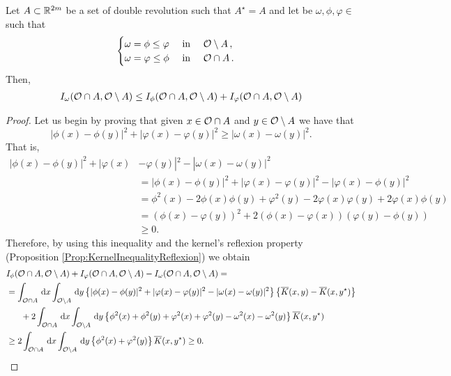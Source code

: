 \begin{lemma}
\label{Lemma: InteractionInequalityMinimumFunction}
Let $A\subset\mathbb{R}^{2m}$ be a set of double revolution such that $A^\star = A$ and let be $\omega, \phi, \varphi \in $ such that
$$\begin{cases}
\omega = \phi \leq \varphi \ \ \ \ \textrm{in } \ \ \ \mathcal{O} \setminus A\,,\\
\omega = \varphi \leq \phi \ \ \ \ \textrm{in } \ \ \ \mathcal{O} \cap A\,.
\end{cases}$$
Then,
\begin{align*}
I_\omega(\mathcal{O}\cap A, \mathcal{O} \setminus A) \leq I_\phi(\mathcal{O}\cap A, \mathcal{O} \setminus A) + I_\varphi(\mathcal{O}\cap A, \mathcal{O} \setminus A)
\end{align*}
\end{lemma}

\begin{proof}
Let us begin by proving that given $x\in \mathcal{O} \cap A$ and $y\in \mathcal{O} \setminus A$ we have that
$$ |\phi(x)-\phi(y)|^2+|\varphi(x)-\varphi(y)|^2\geq |\omega(x)-\omega(y)|^2. $$
That is,
\begin{align*}
|\phi(x)-\phi(y)|^2+|\varphi(x)&-\varphi(y)|^2 - |\omega(x)-\omega(y)|^2 \\
&= |\phi(x)-\phi(y)|^2+|\varphi(x)-\varphi(y)|^2 - |\varphi(x)-\phi(y)|^2 \\
&= \phi^2(x)-2\phi(x)\phi(y)+\varphi^2(y)-2\varphi(x)\varphi(y)+2\varphi(x)\phi(y) \\
&= \left( \phi(x) - \varphi(y)\right) ^2+2\left( \phi(x)-\varphi(x) \right) \left( \varphi(y)-\phi(y) \right) \\
&\geq 0.
\end{align*}
Therefore, by using this inequality and the kernel's reflexion property (Proposition \ref{Prop:KernelInequalityReflexion}) we obtain
\begin{align*}
I_\phi(\ocal\cap A, \ocal \setminus A) &+ I_\varphi(\ocal\cap A, \ocal \setminus A) - I_\omega(\ocal\cap A, \ocal \setminus A) = \\
&\hspace{-26mm}= \int_{\ocal\cap A} \d x \int_{\ocal\setminus A} \d y \left\{|\phi(x)-\phi(y)|^2+|\varphi(x)-\varphi(y)|^2-|\omega(x)-\omega(y)|^2 \right\} \left\{\overline{K}(x,y)-\overline{K}(x,y^\star)\right\} \\
&\hspace{-20mm}+ 2 \int_{\ocal\cap A} \d x \int_{\ocal\setminus A} \d y \left\{\phi^2(x)+\phi^2(y)+\varphi^2(x)+\varphi^2(y)-\omega^2(x)-\omega^2(y) \right\} \overline{K}(x,y^\star) \\
&\hspace{-26mm}\geq 2\int_{\ocal\cap A} \d x \int_{\ocal\setminus A} \d y \left\{
\phi^2(x)+\varphi^2(y)\right\} \overline{K}(x,y^\star) \geq 0.
\end{align*}
\end{proof}

